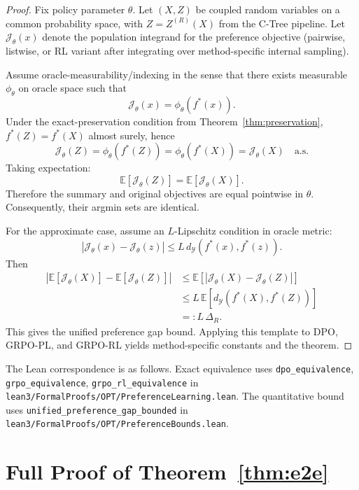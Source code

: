 \documentclass[11pt]{article}
\newcommand{\E}{\mathbb{E}}
\newcommand{\Y}{\mathcal{Y}}
\newcommand{\metric}{d_{\Y}}
\newcommand{\fstar}{f^\ast}
\begin{document}
\begin{proof}
Fix policy parameter $\theta$.
Let $(X,Z)$ be coupled random variables on a common probability space, with
$Z=Z^{(R)}(X)$ from the C-Tree pipeline.
Let $\mathcal{J}_\theta(x)$ denote the population integrand for the preference objective (pairwise, listwise, or RL variant after integrating over method-specific internal sampling).

Assume oracle-measurability/indexing in the sense that there exists measurable
$\phi_\theta$ on oracle space such that
\[
\mathcal{J}_\theta(x)=\phi_\theta(\fstar(x)).
\]
Under the exact-preservation condition from Theorem~\ref{thm:preservation},
$\fstar(Z)=\fstar(X)$ almost surely, hence
\[
\mathcal{J}_\theta(Z)=\phi_\theta(\fstar(Z))
=\phi_\theta(\fstar(X))
=\mathcal{J}_\theta(X)
\quad\text{a.s.}
\]
Taking expectation:
\[
\E[\mathcal{J}_\theta(Z)]=\E[\mathcal{J}_\theta(X)].
\]
Therefore the summary and original objectives are equal pointwise in $\theta$.
Consequently, their argmin sets are identical.

For the approximate case, assume an $L$-Lipschitz condition in oracle metric:
\[
|\mathcal{J}_\theta(x)-\mathcal{J}_\theta(z)|
\le L\,\metric(\fstar(x),\fstar(z)).
\]
Then
\begin{align*}
\left|\E[\mathcal{J}_\theta(X)]-\E[\mathcal{J}_\theta(Z)]\right|
&\le \E\left[\left|\mathcal{J}_\theta(X)-\mathcal{J}_\theta(Z)\right|\right] \\
&\le L\,\E\left[\metric(\fstar(X),\fstar(Z))\right] \\
&=: L\,\Delta_R.
\end{align*}
This gives the unified preference gap bound.
Applying this template to DPO, GRPO-PL, and GRPO-RL yields method-specific constants and the theorem.
\end{proof}

The Lean correspondence is as follows. Exact equivalence uses
\texttt{dpo\_equivalence}, \texttt{grpo\_equivalence},
\texttt{grpo\_rl\_equivalence} in
\texttt{lean3/FormalProofs/OPT/PreferenceLearning.lean}.
The quantitative bound uses
\texttt{unified\_preference\_gap\_bounded} in
\texttt{lean3/FormalProofs/OPT/PreferenceBounds.lean}.

\section{Full Proof of Theorem~\ref{thm:e2e}}\label{app:proof-e2e}
\end{document}
